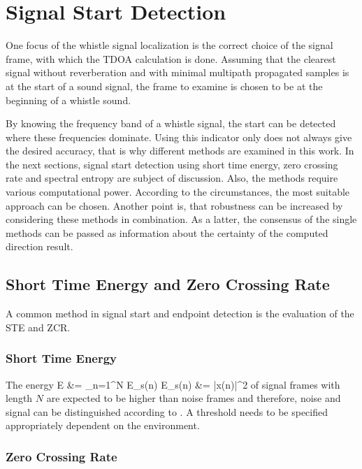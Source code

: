 \section{Signal Start Detection}
\label{sec:02_signalStartDetection}

One focus of the whistle signal localization is the correct choice of the
signal frame, with which the \ac{TDOA} calculation is done.
Assuming that the clearest signal without reverberation and with minimal
multipath propagated samples is at the start of a sound signal,
the frame to examine is chosen to be at the beginning of a whistle sound.

By knowing the frequency band of a whistle signal, the start can be detected
where these frequencies dominate.
Using this indicator only does not always give the desired accuracy, that is why
different methods are examined in this work.
In the next sections, signal start detection using short time energy,
zero crossing rate and spectral entropy are subject of discussion.
Also, the methods require
various computational power. According to the circumstances, the most suitable
approach can be chosen.
Another point is, that robustness can be increased by considering these methods
in combination.
As a latter, the consensus of the single methods can be passed as information
about the certainty of the computed direction result.

\subsection{Short Time Energy and Zero Crossing Rate}

A common method in signal start and endpoint detection is the evaluation
of the \ac{STE} and \ac{ZCR}.

\subsubsection{Short Time Energy}
The energy
\bal
    E &= \sum_{n=1}^N E_s(n)
    \label{eq:02_energy}
    E_s(n) &= |x(n)|^2
    \label{eq:02_spectralEnergy}
\eal
of signal frames with length $N$ are expected to be higher than noise frames
and therefore, noise and signal can be distinguished
according to \cite{Z_W_voiceActivity}.
A threshold needs to be specified appropriately dependent on the environment.

\subsubsection{Zero Crossing Rate}

